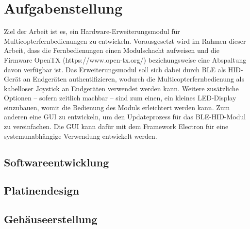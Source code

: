 
\chapter{Aufgabenstellung}

Ziel der Arbeit ist es, ein Hardware-Erweiterungsmodul für Multicopterfernbedienungen zu entwickeln. Vorausgesetzt wird im Rahmen dieser Arbeit, dass die Fernbedienungen einen Modulschacht aufweisen
und die Firmware OpenTX (https://www.open-tx.org/) beziehungsweise eine Abspaltung davon verfügbar ist. Das Erweiterungsmodul soll sich dabei durch BLE als HID-Gerät an Endgeräten authentifizieren, wodurch die
Multicopterfernbedienung als kabelloser Joystick an Endgeräten verwendet werden kann.
Weitere zusätzliche Optionen -- sofern zeitlich machbar -- sind zum einen, ein kleines LED-Display einzubauen, womit die Bedienung des Moduls erleichtert werden kann. Zum anderen eine GUI zu entwickeln,
um den Updateprozess für das BLE-HID-Modul zu vereinfachen. Die GUI kann dafür mit dem Framework Electron für eine systemunabhängige Verwendung entwickelt werden.

\section{Softwareentwicklung}
\section{Platinendesign}
\section{Gehäuseerstellung}